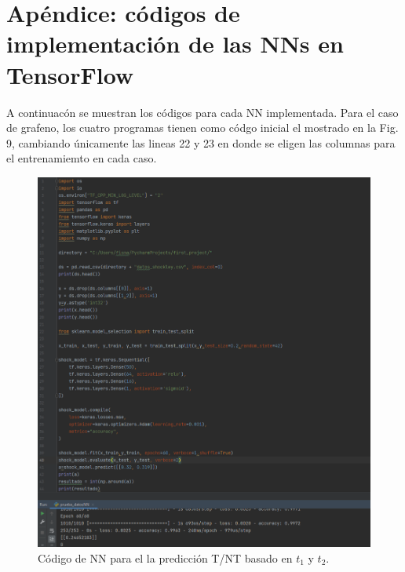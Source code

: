 \documentclass{article}
\begin{document}
\section*{Apéndice: códigos de implementación de las NNs en TensorFlow}
A continuacón se muestran los códigos para cada NN implementada. Para el caso de grafeno, los cuatro programas tienen como códgo inicial el mostrado en la Fig. 9, cambiando únicamente las lineas 22 y 23 en donde se eligen las columnas para el entrenamiemto en cada caso.
\begin{figure}[th!]
\centering
   \includegraphics[width=1.\textwidth]{prog_shockley_datos.png}
   \caption{Código de NN para el la predicción T/NT basado en $t_1$ y $t_2$.}
\end{figure}
\newpage
\end{document}
